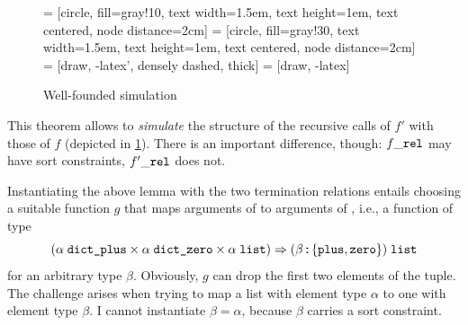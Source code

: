 \begin{figure}[t]
  \centering
   = [circle, fill=gray!10, text width=1.5em, text height=1em, text centered, node distance=2cm]
   = [circle, fill=gray!30, text width=1.5em, text height=1em, text centered, node distance=2cm]
   = [draw, -latex', densely dashed, thick]
   = [draw, -latex]

  \caption{Well-founded simulation}
  \label{fig:preproc:dict:wfsim}
\end{figure}

\noindent
This theorem allows to \emph{simulate} the structure of the recursive calls of $f'$ with those of $f$ (depicted in \cref{fig:preproc:dict:wfsim}).
There is an important difference, though: $f\_\texttt{\textup{rel}}$ may have sort constraints, $f'\_\texttt{\textup{rel}}$ does not.

Instantiating the above lemma with the two termination relations entails choosing a suitable function $g$ that maps arguments of  to arguments of , i.e., a function of type
\[ (\alpha\;\texttt{\textup{dict\_plus}} \times \alpha\;\texttt{\textup{dict\_zero}} \times \alpha\;\texttt{\textup{list}}) \Rightarrow (\beta \mathbin{:\!\!:} \{ \texttt{\textup{plus}}, \texttt{\textup{zero}} \}) \;\texttt{\textup{list}} \]
for an arbitrary type $\beta$.
Obviously, $g$ can drop the first two elements of the tuple.
The challenge arises when trying to map a list with element type $\alpha$ to one with element type $\beta$.
I cannot instantiate $\beta = \alpha$, because $\beta$ carries a sort constraint.

